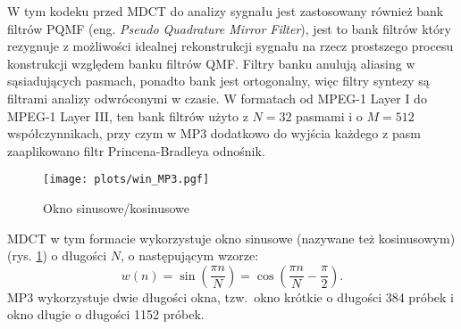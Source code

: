 \documentclass[pl,12pt]{aghdpl}
\begin{document}
W tym kodeku przed MDCT do analizy sygnału jest zastosowany również bank
filtrów PQMF (eng. \textit{Pseudo Quadrature Mirror Filter}), jest to bank filtrów
który rezygnuje z możliwości idealnej rekonstrukcji sygnału na rzecz prostszego
procesu konstrukcji względem banku filtrów QMF. Filtry banku anulują aliasing w
sąsiadujących pasmach, ponadto bank jest ortogonalny, więc filtry syntezy są
filtrami analizy odwróconymi w czasie.
W formatach od MPEG-1 Layer I do MPEG-1 Layer III, ten bank filtrów użyto z $N = 32$
pasmami i o $M = 512$ współczynnikach, przy czym w MP3 dodatkowo do wyjścia każdego z
pasm zaaplikowano filtr Princena-Bradleya {\color{red}odnośnik}.

\begin{figure}[!tbh]
  \centering
  \texttt{[image: plots/win\_MP3.pgf]}
  \caption{Okno sinusowe/kosinusowe}
  \label{fig:win_MP3}
\end{figure}

MDCT w tym formacie wykorzystuje okno sinusowe (nazywane też kosinusowym) (rys.
\ref{fig:win_MP3}) o długości $N$, o następującym wzorze:
\begin{equation}\label{eq:sine_win}
  w(n) = \sin\left(\frac{\pi n}{N}\right) = \cos\left(\frac{\pi n}{N} - \frac{\pi}{2}\right).
\end{equation}
MP3 wykorzystuje dwie długości okna, tzw.\ okno krótkie o długości 384 próbek i okno
długie o długości 1152 próbek.
\end{document}
